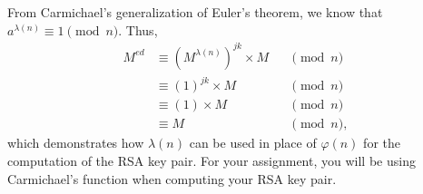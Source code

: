 From Carmichael's generalization of Euler's theorem, we know that
$a^{\lambda(n)} \equiv 1 \pmod{n}$. Thus,
\begin{align*}
  M^{e d} &\equiv (M^{\lambda(n)})^{jk} \times M &&\pmod{n} \\
          &\equiv (1)^{jk} \times M  &&\pmod{n} \\
          &\equiv (1) \times M  &&\pmod{n} \\
          &\equiv M  &&\pmod{n},
\end{align*}
which demonstrates how $\lambda(n)$ can be used in place of $\varphi(n)$ for the
computation of the RSA key pair. For your assignment, you will be using
Carmichael's function when computing your RSA key pair.
